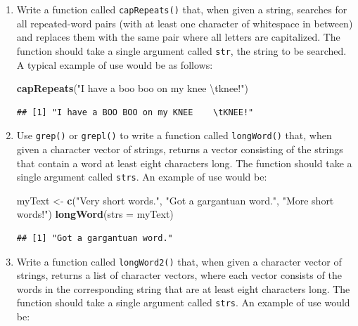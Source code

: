 \documentclass[]{book}
\makeatletter
\newenvironment{Shaded}{\begin{snugshade}}{\end{snugshade}}
\newcommand{\KeywordTok}[1]{\textcolor[rgb]{0.13,0.29,0.53}{\textbf{{#1}}}}
\newcommand{\DataTypeTok}[1]{\textcolor[rgb]{0.13,0.29,0.53}{{#1}}}
\newcommand{\CharTok}[1]{\textcolor[rgb]{0.31,0.60,0.02}{{#1}}}
\newcommand{\StringTok}[1]{\textcolor[rgb]{0.31,0.60,0.02}{{#1}}}
\newcommand{\NormalTok}[1]{{#1}}
\newenvironment{kframe}{%
\medskip{}
\setlength{\fboxsep}{.8em}
 \def\at@end@of@kframe{}%
 \ifinner\ifhmode%
  \def\at@end@of@kframe{\end{minipage}}%
  \begin{minipage}{\columnwidth}%
 \fi\fi%
 \def\FrameCommand##1{\hskip\@totalleftmargin \hskip-\fboxsep
 \colorbox{shadecolor}{##1}\hskip-\fboxsep
     \hskip-\linewidth \hskip-\@totalleftmargin \hskip\columnwidth}%
 \MakeFramed {\advance\hsize-\width
   \@totalleftmargin\z@ \linewidth\hsize
   \@setminipage}}%
 {\par\unskip\endMakeFramed%
 \at@end@of@kframe}
\renewenvironment{Shaded}{\begin{kframe}}{\end{kframe}}
\theoremstyle{definition}
\theoremstyle{definition}
\theoremstyle{remark}
\makeatother
\begin{document}
{\begin{enumerate}
\begin{verbatim}
## [1] "Tom"      "Thatcher" "Ellen"
\end{verbatim}
\item
  Write a function called \texttt{capRepeats()} that, when given a
  string, searches for all repeated-word pairs (with at least one
  character of whitespace in between) and replaces them with the same
  pair where all letters are capitalized. The function should take a
  single argument called \texttt{str}, the string to be searched. A
  typical example of use would be as follows:

\begin{Shaded}
\begin{Highlighting}[]
\KeywordTok{capRepeats}\NormalTok{(}\StringTok{"I have a boo boo on my knee    }\CharTok{\textbackslash{}t}\StringTok{knee!"}\NormalTok{)}
\end{Highlighting}
\end{Shaded}

\begin{verbatim}
## [1] "I have a BOO BOO on my KNEE    \tKNEE!"
\end{verbatim}
\item
  Use \texttt{grep()} or \texttt{grepl()} to write a function called
  \texttt{longWord()} that, when given a character vector of strings,
  returns a vector consisting of the strings that contain a word at
  least eight characters long. The function should take a single
  argument called \texttt{strs}. An example of use would be:

\begin{Shaded}
\begin{Highlighting}[]
\NormalTok{myText <-}\StringTok{ }\KeywordTok{c}\NormalTok{(}\StringTok{"Very short words."}\NormalTok{, }\StringTok{"Got a gargantuan word."}\NormalTok{, }\StringTok{"More short words!"}\NormalTok{)}
\KeywordTok{longWord}\NormalTok{(}\DataTypeTok{strs =} \NormalTok{myText)}
\end{Highlighting}
\end{Shaded}

\begin{verbatim}
## [1] "Got a gargantuan word."
\end{verbatim}
\item
  Write a function called \texttt{longWord2()} that, when given a
  character vector of strings, returns a list of character vectors,
  where each vector consists of the words in the corresponding string
  that are at least eight characters long. The function should take a
  single argument called \texttt{strs}. An example of use would be:


\end{enumerate}}
\end{document}

